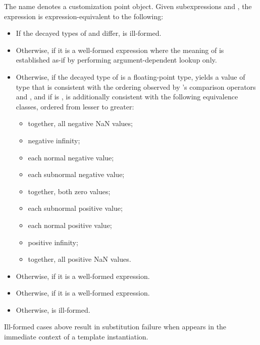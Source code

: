%
\pnum
The name  denotes
a customization point object.
Given subexpressions  and ,
the expression 
is expression-equivalent to the following:
\begin{itemize}
\item
  If the decayed types of  and  differ,
   is ill-formed.
\item
  Otherwise, 
  if it is a well-formed expression
  where the meaning of  is established as-if by performing
  argument-dependent lookup only.
\item
  Otherwise, if the decayed type  of 
  is a floating-point type,
  yields a value of type 
  that is consistent with the ordering
  observed by 's comparison operators and , and
  if  is ,
  is additionally consistent with the following equivalence classes,
  ordered from lesser to greater:
  \begin{itemize}
  \item together, all negative NaN values;
  \item negative infinity;
  \item each normal negative value;
  \item each subnormal negative value;
  \item together, both zero values;
  \item each subnormal positive value;
  \item each normal positive value;
  \item positive infinity;
  \item together, all positive NaN values.
  \end{itemize}
\item
  Otherwise, 
  if it is a well-formed expression.
\item
  Otherwise, 
  if it is a well-formed expression.
\item
  Otherwise,  is ill-formed.
\end{itemize}

\begin{note}
Ill-formed cases above result in substitution failure
when  appears in the immediate context
of a template instantiation.
\end{note}

